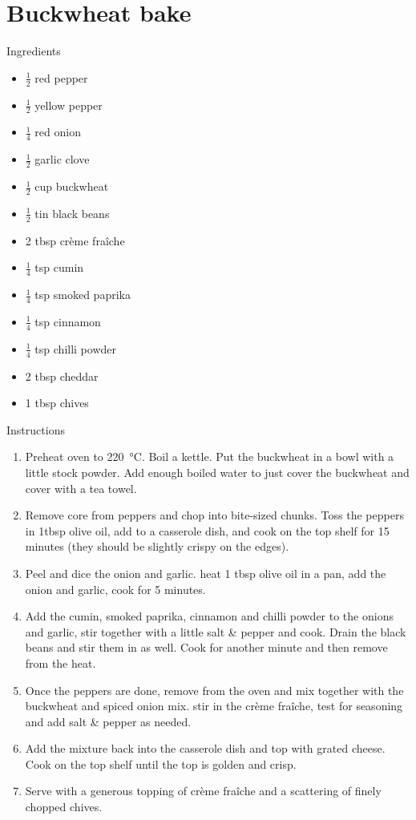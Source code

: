\documentclass[../dinner.tex]{subfiles}
\begin{document}
	\pagestyle{fancy}
	\fancyhf{}
	\newpage
	\section{Buckwheat bake}
	\lhead{}
	{\Large Ingredients}
	\begin{multicols}{2}
		\begin{itemize}
			\item \(\frac{1}{2}\) red pepper
			\item \(\frac{1}{2}\) yellow pepper
			\item \(\frac{1}{4}\) red onion
			\item \(\frac{1}{2}\) garlic clove
			\item \(\frac{1}{2}\) cup buckwheat
			\item \(\frac{1}{2}\) tin black beans
			\item 2 tbsp cr\`eme fra\^iche
		\end{itemize}
		\columnbreak
		\begin{itemize}
			\item \(\frac{1}{4}\) tsp cumin
			\item \(\frac{1}{4}\) tsp smoked paprika
			\item \(\frac{1}{4}\) tsp cinnamon
			\item \(\frac{1}{4}\) tsp chilli powder
			\item 2 tbsp cheddar
			\item 1 tbsp chives
		\end{itemize}
	\end{multicols}

	{\Large Instructions}
	\begin{enumerate}
		\item Preheat oven to \SI{220}{\celsius}. Boil a kettle. Put the buckwheat in a bowl with a little stock powder. Add enough boiled water to just cover the buckwheat and cover with a tea towel.
		\item Remove core from peppers and chop into bite-sized chunks. Toss the peppers in 1tbsp olive oil, add to a casserole dish, and cook on the top shelf for 15 minutes (they should be slightly crispy on the edges).
		\item Peel and dice the onion and garlic. heat 1 tbsp olive oil in a pan, add the onion and garlic, cook for 5 minutes.
		\item Add the cumin, smoked paprika, cinnamon and chilli powder to the onions and garlic, stir together with a little salt \& pepper and cook. Drain the black beans and stir them in as well. Cook for another minute and then remove from the heat. 
		\item Once the peppers are done, remove from the oven and mix together with the buckwheat and spiced onion mix. stir in the  cr\`eme fra\^iche, test for seasoning and add salt \& pepper as needed.
		\item Add the mixture back into the casserole dish and top with grated cheese. Cook on the top shelf until the top is golden and crisp.
		\item Serve with a generous topping of  cr\`eme fra\^iche and a scattering of finely chopped chives.
	\end{enumerate}
\end{document}
